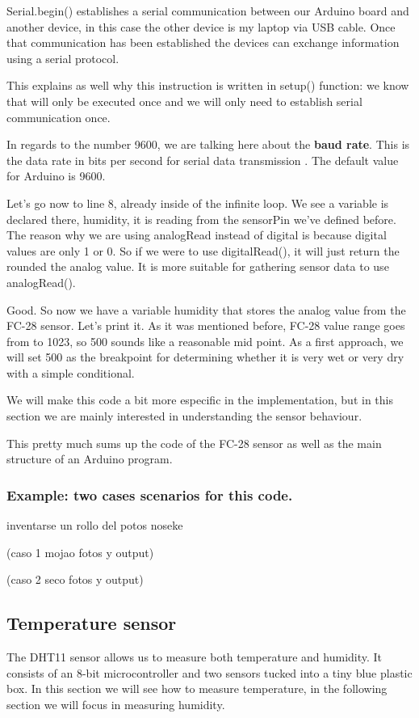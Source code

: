 Serial.begin() establishes a serial communication between our Arduino board and another device, in this case the other device is my laptop via USB cable. Once that communication has been established the devices can exchange information using a serial protocol.

This explains as well why this instruction is written in setup() function: we know that will only be executed once and we will only need to establish serial communication once.

In regards to the number 9600, we are talking here about the \textbf{baud rate}. This is the data rate in bits per second for serial data transmission \cite{baud}. The default value for Arduino is 9600.

Let's go now to line 8, already inside of the infinite loop. We see a variable is declared there, humidity, it is reading from the sensorPin we've defined before. The reason why we are using analogRead instead of digital is because digital values are only 1 or 0. So if we were to use digitalRead(), it will just return the rounded the analog value. It is more suitable for gathering sensor data to use analogRead().

Good. So now we have a variable humidity that stores the analog value from the FC-28 sensor. Let's print it. As it was mentioned before, FC-28 value range goes from  to 1023, so 500 sounds like a reasonable mid point. As a first approach, we will set 500 as the breakpoint for determining whether it is very wet or very dry with a simple conditional.

We will make this code a bit more especific in the implementation, but in this section we are mainly interested in understanding the sensor behaviour.

This pretty much sums up the code of the FC-28 sensor as well as the main structure of an Arduino program.

\subsubsection{Example: two cases scenarios for this code.}

inventarse un rollo del potos noseke

(caso 1 mojao fotos y output)

(caso 2 seco fotos y output)


\subsection{Temperature sensor}
The DHT11 sensor\cite{dht11-manual} allows us to measure both temperature and humidity. It consists of an 8-bit microcontroller and two sensors tucked into a tiny blue plastic box. In this section we will see how to measure temperature, in the following section we will focus in measuring humidity.

